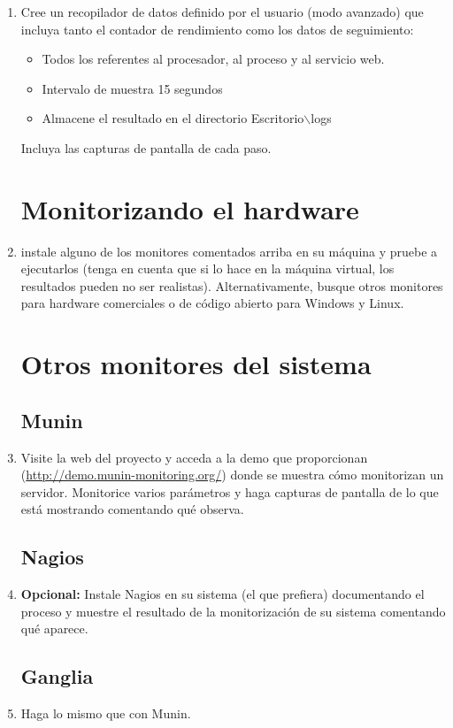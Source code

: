 \documentclass[paper=a4, fontsize=11pt]{scrartcl} %
\numberwithin{equation}{section} %
\numberwithin{figure}{section} %
\numberwithin{table}{section} %
\begin{document}
\begin{enumerate}
		\item Cree un recopilador de datos definido por el usuario (modo avanzado) que incluya tanto
		el contador de rendimiento como los datos de seguimiento:
		\begin{itemize}
			\item Todos los referentes al procesador, al proceso y al servicio web.
			\item Intervalo de muestra 15 segundos
			\item Almacene el resultado en el directorio Escritorio$\backslash$logs
		\end{itemize}
		Incluya las capturas de pantalla de cada paso.
		
	\section{Monitorizando el hardware}
		\item instale alguno de los monitores comentados arriba en su máquina y pruebe a ejecutarlos
		(tenga en cuenta que si lo hace en la máquina virtual, los resultados pueden no ser
		realistas). Alternativamente, busque otros monitores para hardware comerciales o de código
		abierto para Windows y Linux.
		
	\section{Otros monitores del sistema}
	\subsection{Munin}
		\item Visite la web del proyecto y acceda a la demo que proporcionan
		(\url{http://demo.munin-monitoring.org/}) donde se muestra cómo monitorizan un servidor.
		Monitorice varios parámetros y haga capturas de pantalla de lo que está mostrando comentando
		qué observa.
	\subsection{Nagios}
		\item \textbf{Opcional:} Instale Nagios en su sistema (el que prefiera) documentando el
		proceso y muestre el resultado de la monitorización de su sistema comentando qué aparece.
		
	\subsection{Ganglia}
		\item Haga lo mismo que con Munin.
		

\end{enumerate}
\end{document}
